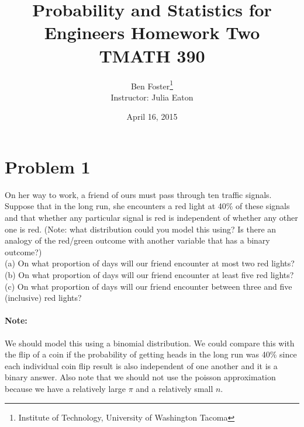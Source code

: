 \documentclass{article}
\begin{document}
{
	\title{Probability and Statistics for Engineers Homework Two \\ TMATH 390}
	\author{Ben Foster\thanks{
		Institute of Technology, University of Washington Tacoma} \\
		Instructor: Julia Eaton}
	\date{April 16, 2015}
	\maketitle
	\thispagestyle{empty} %
	\clearpage
	
	\tableofcontents
	\clearpage
	\setcounter{page}{1}
}

\section*{Problem 1} %

	On her way to work, a friend of ours must pass through ten traffic signals. Suppose that in the 
	long run, she encounters a red light at 40\% of these signals and that whether any particular 
	signal is red is independent of whether any other one is red. (Note: what distribution could you 
	model this using? Is there an analogy of the red/green outcome with another variable that has a 
	binary outcome?) \\

	(a) On what proportion of days will our friend encounter at most two red lights? \\
	(b) On what proportion of days will our friend encounter at least five red lights? \\
	(c) On what proportion of days will our friend encounter between three and five (inclusive) red 	
	lights?

	\paragraph{Note:} We should model this using a binomial distribution. We could compare this 
	with the flip of a coin if the probability of getting heads in the long run was 40\% since each 
	individual coin flip result is also independent of one another and it is a binary answer. Also 
	note that we should not use the poisson approximation because we have a relatively large $\pi$ 
	and a relatively small $n$.
\end{document}
